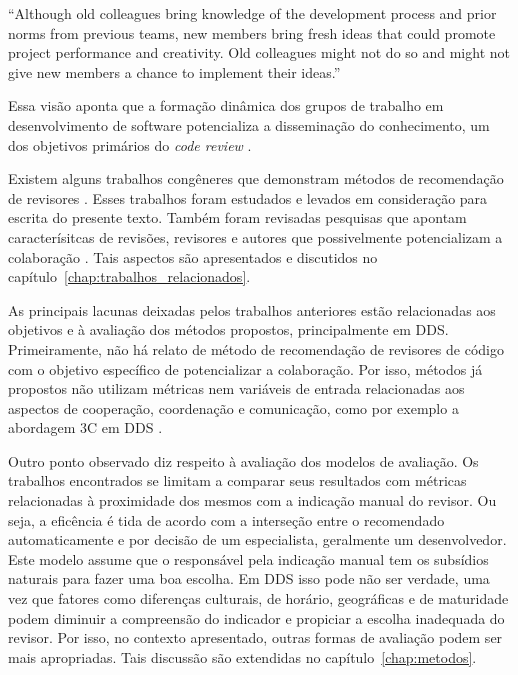 \documentclass[preprint,review, 12pt]{elsarticle}
\begin{document}
  \begin{description}
    ``Although old colleagues bring knowledge of the development process and prior norms from previous teams, new members bring fresh ideas that could promote project performance and creativity. Old colleagues might not do so and might not give new members a chance to implement their ideas.''
  \end{description}

  Essa visão aponta que a formação  dinâmica dos grupos de trabalho em desenvolvimento de software potencializa a disseminação do conhecimento, um dos objetivos primários do \textit{code review} \cite{Bacchelli2013}.

  Existem alguns trabalhos congêneres que demonstram métodos de recomendação de revisores \cite{yu2014,Xia2015261,jiang2017}. Esses trabalhos foram estudados e levados em consideração para escrita do presente texto. Também foram revisadas pesquisas que apontam caracterísitcas de revisões, revisores e autores que possivelmente potencializam a colaboração \cite{Kemerer2009,Bird2015191,Baysal2013122}. Tais aspectos são apresentados e discutidos no capítulo~\ref{chap:trabalhos_relacionados}.

  As principais lacunas deixadas pelos trabalhos anteriores estão relacionadas aos objetivos e à avaliação dos métodos propostos, principalmente em DDS. Primeiramente, não há relato de método de recomendação de revisores de código com o objetivo específico de potencializar a colaboração. Por isso, métodos já propostos não utilizam métricas nem variáveis de entrada relacionadas aos aspectos de cooperação, coordenação e comunicação, como por exemplo a abordagem 3C em DDS \cite{fuks2003}.

  Outro ponto observado diz respeito à avaliação dos modelos de avaliação. Os trabalhos encontrados se limitam a comparar seus resultados com métricas relacionadas à proximidade dos mesmos com a indicação manual do revisor. Ou seja, a eficência é tida de acordo com a interseção entre o recomendado automaticamente e por decisão de um especialista, geralmente um desenvolvedor. Este modelo assume que o responsável pela indicação manual tem os subsídios naturais para fazer uma boa escolha. Em DDS isso pode não ser verdade, uma vez que fatores como diferenças culturais, de horário, geográficas e de maturidade podem diminuir a compreensão do indicador e propiciar a escolha inadequada do revisor. Por isso, no contexto apresentado, outras formas de avaliação podem ser mais apropriadas. Tais discussão são extendidas no capítulo~\ref{chap:metodos}.
\end{document}
